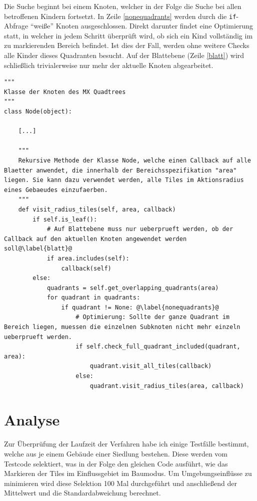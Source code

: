 \documentclass[%
			paper=a4,%
			DIV12,
			liststotoc,
			bibtotoc,
			draft=false,%
			titlepage,
			numbers=noendperiod
			]{scrartcl}
\newcommand{\inlinecode}[1]{\mbox{\texttt{#1}}}
\begin{document}
Die Suche beginnt bei einem Knoten, welcher in der Folge die Suche bei allen betroffenen Kindern fortsetzt.
In Zeile \ref{nonequadrants} werden durch die \inlinecode{if}-Abfrage "`weiße"' Knoten ausgeschlossen.
Direkt darunter findet eine Optimierung statt, in welcher in jedem Schritt überprüft wird, ob sich ein Kind vollständig im zu markierenden Bereich befindet.
Ist dies der Fall, werden ohne weitere Checks alle Kinder dieses Quadranten besucht.
Auf der Blattebene (Zeile \ref{blatt}) wird schließlich trivialerweise nur mehr der aktuelle Knoten abgearbeitet.

\begin{lstlisting}[float=h,caption=Python-ähnlicher Pseudocode zur Lösung des Markierungsproblems,label=visit_rad]
"""
Klasse der Knoten des MX Quadtrees
"""
class Node(object):

	[...]

	"""
	Rekursive Methode der Klasse Node, welche einen Callback auf alle Blaetter anwendet, die innerhalb der Bereichsspezifikation "area" liegen. Sie kann dazu verwendet werden, alle Tiles im Aktionsradius eines Gebaeudes einzufaerben.
	"""
	def visit_radius_tiles(self, area, callback)
		if self.is_leaf():
			# Auf Blattebene muss nur ueberprueft werden, ob der Callback auf den aktuellen Knoten angewendet werden soll@\label{blatt}@
			if area.includes(self):
				callback(self)
		else:
			quadrants = self.get_overlapping_quadrants(area)
			for quadrant in quadrants:
				if quadrant != None: @\label{nonequadrants}@
					# Optimierung: Sollte der ganze Quadrant im Bereich liegen, muessen die einzelnen Subknoten nicht mehr einzeln ueberprueft werden.
					if self.check_full_quadrant_included(quadrant, area):
						quadrant.visit_all_tiles(callback)
					else:
						quadrant.visit_radius_tiles(area, callback)
\end{lstlisting}

\section{Analyse}


Zur Überprüfung der Laufzeit der Verfahren habe ich einige Testfälle bestimmt, welche aus je einem Gebäude einer Siedlung bestehen.
Diese werden vom Testcode selektiert, was in der Folge den gleichen Code ausführt, wie das Markieren der Tiles im Einflussgebiet im Baumodus.
Um Umgebungseinflüsse zu minimieren wird diese Selektion 100 Mal durchgeführt und anschließend der Mittelwert und die Standardabweichung berechnet.
\end{document}
